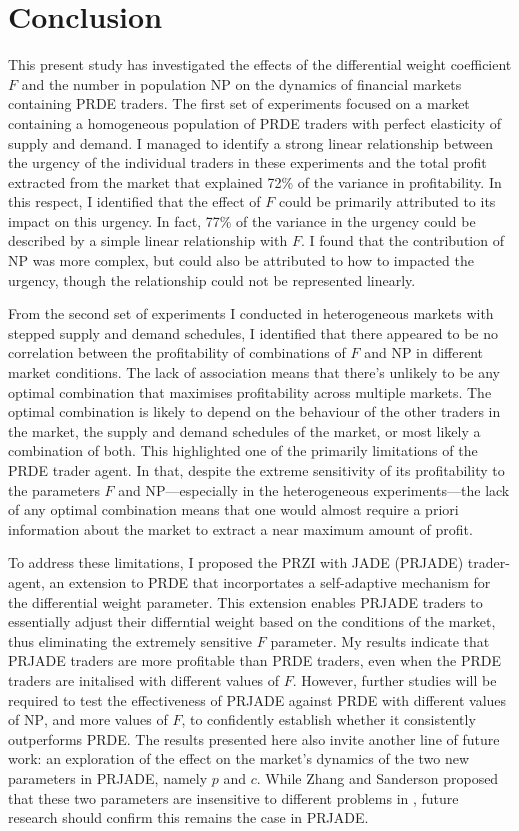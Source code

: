 \documentclass[conference]{IEEEtran}
\begin{document}
\section{Conclusion}

This present study has investigated the effects of the differential weight coefficient $F$ and the number in population $\mathrm{NP}$ on the dynamics of financial markets containing PRDE traders.
The first set of experiments focused on a market containing a homogeneous population of PRDE traders with perfect elasticity of supply and demand.
I managed to identify a strong linear relationship between the urgency of the individual traders in these experiments and the total profit extracted from the market that explained 72\% of the variance in profitability.
In this respect, I identified that the effect of $F$ could be primarily attributed to its impact on this urgency.
In fact, 77\% of the variance in the urgency could be described by a simple linear relationship with $F$.
I found that the contribution of $\mathrm{NP}$ was more complex, but could also be attributed to how to impacted the urgency, though the relationship could not be represented linearly.

From the second set of experiments I conducted in heterogeneous markets with stepped supply and demand schedules, I identified that there appeared to be no correlation between the profitability of combinations of $F$ and $\mathrm{NP}$ in different market conditions.
The lack of association means that there's unlikely to be any optimal combination that maximises profitability across multiple markets.
The optimal combination is likely to depend on the behaviour of the other traders in the market, the supply and demand schedules of the market, or most likely a combination of both.
This highlighted one of the primarily limitations of the PRDE trader agent.
In that, despite the extreme sensitivity of its profitability to the parameters $F$ and $\mathrm{NP}$---especially in the heterogeneous experiments---the lack of any optimal combination means that one would almost require a priori information about the market to extract a near maximum amount of profit.

To address these limitations, I proposed the PRZI with JADE (PRJADE) trader-agent, an extension to PRDE that incorportates a self-adaptive mechanism for the differential weight parameter.
This extension enables PRJADE traders to essentially adjust their differntial weight based on the conditions of the market, thus eliminating the extremely sensitive $F$ parameter.
My results indicate that PRJADE traders are more profitable than PRDE traders, even when the PRDE traders are initalised with different values of $F$.
However, further studies will be required to test the effectiveness of PRJADE against PRDE with different values of $\mathrm{NP}$, and more values of $F$, to confidently establish whether it consistently outperforms PRDE.
The results presented here also invite another line of future work: an exploration of the effect on the market's dynamics of the two new parameters in PRJADE, namely $p$ and $c$.
While Zhang and Sanderson proposed that these two parameters are insensitive to different problems in \cite{ZhangSanderson}, future research should confirm this remains the case in PRJADE.



\end{document}

